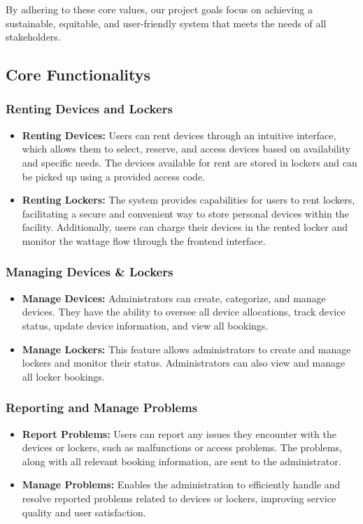 By adhering to these core values, our project goals focus on achieving a sustainable, equitable, and user-friendly system that meets the needs of all stakeholders.

\subsection{Core Functionalitys}
\subsubsection{Renting Devices and Lockers}
\begin{itemize}
\item \textbf{Renting Devices:} Users can rent devices through an intuitive interface, which allows them to select, reserve, and access devices based on availability and specific needs. The devices available for rent are stored in lockers and can be picked up using a provided access code.
\item \textbf{Renting Lockers:}  The system provides capabilities for users to rent lockers, facilitating a secure and convenient way to store personal devices within the facility. Additionally, users can charge their devices in the rented locker and monitor the wattage flow through the frontend interface.
\end{itemize}

\subsubsection{Managing Devices \& Lockers}
\begin{itemize}
\item \textbf{Manage Devices:} Administrators can create, categorize, and manage devices. They have the ability to oversee all device allocations, track device status, update device information, and view all bookings.

\item \textbf{Manage Lockers:} This feature allows administrators to create and manage lockers and monitor their status. Administrators can also view and manage all locker bookings.
\end{itemize}

\subsubsection{Reporting and Manage Problems}
\begin{itemize}

\item \textbf{Report Problems: }Users can report any issues they encounter with the devices or lockers, such as malfunctions or access problems. The problems, along with all relevant booking information, are sent to the administrator.

\item \textbf{Manage Problems: }Enables the administration to efficiently handle and resolve reported problems related to devices or lockers, improving service quality and user satisfaction.
\end{itemize}

